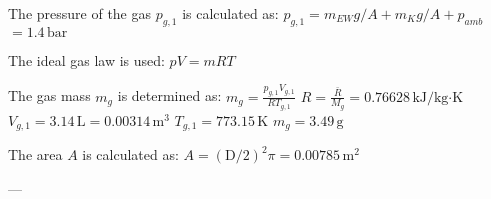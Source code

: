 The pressure of the gas \( p_{g,1} \) is calculated as:  
\( p_{g,1} = m_{EW} g / A + m_K g / A + p_{amb} \)  
\( = 1.4 \, \text{bar} \)  

The ideal gas law is used:  
\( p V = m R T \)  

The gas mass \( m_g \) is determined as:  
\( m_g = \frac{p_{g,1} V_{g,1}}{R T_{g,1}} \)  
\( R = \frac{\bar{R}}{M_g} = 0.76628 \, \text{kJ/kg·K} \)  
\( V_{g,1} = 3.14 \, \text{L} = 0.00314 \, \text{m}^3 \)  
\( T_{g,1} = 773.15 \, \text{K} \)  
\( m_g = 3.49 \, \text{g} \)  

The area \( A \) is calculated as:  
\( A = (\text{D}/2)^2 \pi = 0.00785 \, \text{m}^2 \)  

---